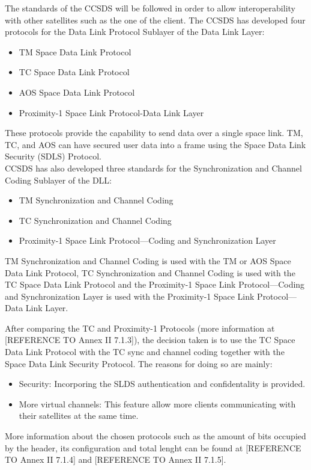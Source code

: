 The standards of the CCSDS will be followed in order to allow interoperability with other satellites such as the one of the client. The CCSDS has developed four protocols for the Data Link Protocol Sublayer of the Data Link Layer\cite{Secretariat2014}:
\begin{itemize}
\item TM Space Data Link Protocol
\item TC Space Data Link Protocol
\item AOS Space Data Link Protocol
\item Proximity-1 Space Link Protocol-Data Link Layer
\end{itemize}
These protocols provide the capability to send data over a single space link. TM, TC, and AOS can have secured user data into a frame using the Space Data Link Security (SDLS) Protocol.\\
 CCSDS has also developed three standards for the Synchronization and Channel Coding Sublayer of the DLL:
 \begin{itemize}
 \item TM Synchronization and Channel Coding
 \item TC Synchronization and Channel Coding
 \item Proximity-1 Space Link Protocol—Coding and Synchronization Layer
 \end{itemize}
TM Synchronization and Channel Coding is used with the TM or AOS Space Data Link
Protocol, TC Synchronization and Channel Coding is used with the TC Space Data Link Protocol and the Proximity-1 Space Link Protocol—Coding and Synchronization Layer is
used with the Proximity-1 Space Link Protocol—Data Link Layer. 

After comparing the TC and Proximity-1 Protocols (more information at [REFERENCE TO Annex II 7.1.3]), the decision taken is to use the TC Space Data Link Protocol with the TC sync and channel coding together with the Space Data Link Security Protocol. The reasons for doing so are mainly:
\begin{itemize}
\item Security: Incorporing the SLDS authentication and confidentality is provided.
\item More virtual channels: This feature allow more clients communicating with their satellites at the same time.
\end{itemize}
More information about the chosen protocols such as the amount of bits occupied by the header, its configuration and total lenght can be found at [REFERENCE TO Annex II 7.1.4] and [REFERENCE TO Annex II 7.1.5].

%
% 
%